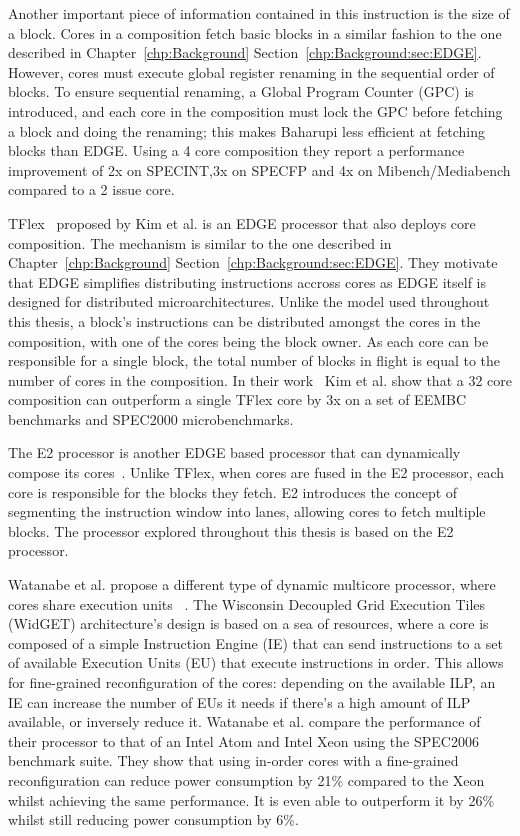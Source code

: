 Another important piece of information contained in this instruction is the size of a block.
Cores in a composition fetch basic blocks in a similar fashion to the one described in Chapter~\ref{chp:Background} Section~\ref{chp:Background:sec:EDGE}.
However, cores must execute global register renaming in the sequential order of blocks.
To ensure sequential renaming, a Global Program Counter (GPC) is introduced, and each core in the composition must lock the GPC before fetching a block and doing the renaming; this makes Baharupi less efficient at fetching blocks than EDGE.
Using a 4 core composition they report a performance improvement of 2x on SPECINT,3x on SPECFP and 4x on Mibench/Mediabench compared to a 2 issue core. 

TFlex~\cite{kim2007tflex} proposed by Kim et al. is an EDGE processor that also deploys core composition.
The mechanism is similar to the one described in Chapter~\ref{chp:Background} Section~\ref{chp:Background:sec:EDGE}.
They motivate that EDGE simplifies distributing instructions accross cores as EDGE itself is designed for distributed microarchitectures.
Unlike the model used throughout this thesis, a block's instructions can be distributed amongst the cores in the composition, with one of the cores being the block owner.
As each core can be responsible for a single block, the total number of blocks in flight is equal to the number of cores in the composition.
In their work~\cite{kim2007tflex} Kim et al. show that a 32 core composition can outperform a single TFlex core by 3x on a set of EEMBC benchmarks and SPEC2000 microbenchmarks.

The E2 processor is another EDGE based processor that can dynamically compose its cores~\cite{putnam2010e2}.
Unlike TFlex, when cores are fused in the E2 processor, each core is responsible for the blocks they fetch.
E2 introduces the concept of segmenting the instruction window into lanes, allowing cores to fetch multiple blocks.
The processor explored throughout this thesis is based on the E2 processor.

Watanabe et al. propose a different type of dynamic multicore processor, where cores share execution units ~\cite{Watanabe2010Widget}.
The Wisconsin Decoupled Grid Execution Tiles (WidGET) architecture's design is based on a sea of resources, where a core is composed of a simple Instruction Engine (IE) that can send instructions to a set of available Execution Units (EU) that execute instructions in order.
This allows for fine-grained reconfiguration of the cores: depending on the available ILP, an IE can increase the number of EUs it needs if there's a high amount of ILP available, or inversely reduce it.
Watanabe et al. compare the performance of their processor to that of an Intel Atom and Intel Xeon using the SPEC2006 benchmark suite.
They show that using in-order cores with a fine-grained reconfiguration can reduce power consumption by 21\% compared to the Xeon whilst achieving the same performance.
It is even able to outperform it by 26\% whilst still reducing power consumption by 6\%.
 
